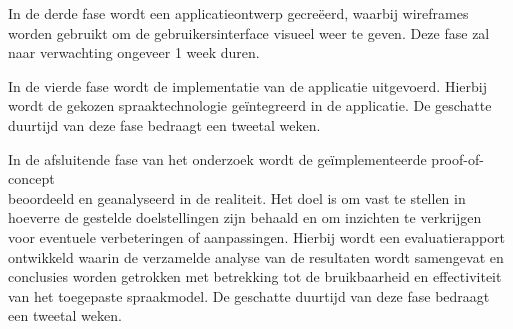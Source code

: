 In de derde fase wordt een applicatieontwerp gecreëerd, waarbij wireframes worden gebruikt om de gebruikersinterface visueel weer te geven. Deze fase zal naar verwachting ongeveer 1 week duren.

In de vierde fase wordt de implementatie van de applicatie uitgevoerd. Hierbij wordt de gekozen spraaktechnologie geïntegreerd in de applicatie. De geschatte duurtijd van deze fase bedraagt een tweetal weken.

In de afsluitende fase van het onderzoek wordt de geïmplementeerde proof-of-concept \\beoordeeld en geanalyseerd in de realiteit. Het doel is om vast te stellen in hoeverre de gestelde doelstellingen zijn behaald en om inzichten te verkrijgen voor eventuele verbeteringen of aanpassingen. Hierbij wordt een evaluatierapport ontwikkeld waarin de verzamelde analyse van de resultaten wordt samengevat en conclusies worden getrokken met betrekking tot de bruikbaarheid en effectiviteit van het toegepaste spraakmodel. De geschatte duurtijd van deze fase bedraagt een tweetal weken.






